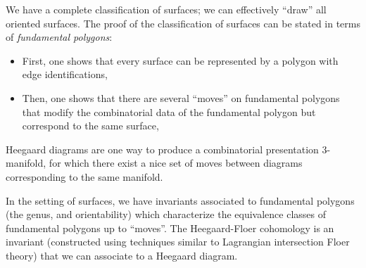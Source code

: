 

We have a complete classification of surfaces; we can effectively ``draw'' all oriented surfaces. The proof of the classification of surfaces can be stated in terms of \emph{fundamental polygons}:
\begin{itemize}
    \item First, one shows that every surface can be represented by a polygon with edge identifications, 
    \item Then, one shows that there are several ``moves'' on fundamental polygons that modify the combinatorial data of the fundamental polygon but correspond to the same surface,
\end{itemize} 


Heegaard diagrams are one way to produce a combinatorial presentation 3-manifold, for which there exist a nice set of moves between diagrams corresponding to the same manifold.

In the setting of surfaces, we have invariants associated to fundamental polygons (the genus, and orientability) which characterize the equivalence classes of fundamental polygons up to ``moves''.
The Heegaard-Floer cohomology is an invariant (constructed using techniques similar to Lagrangian intersection Floer theory) that we can associate to a Heegaard diagram.







